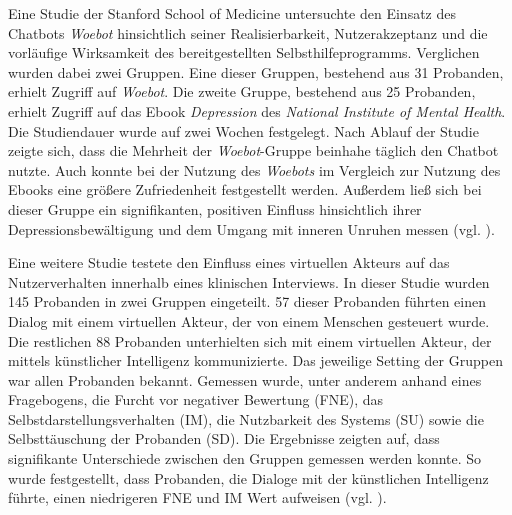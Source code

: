 Eine Studie der Stanford School of Medicine untersuchte den Einsatz des Chatbots \emph{Woebot} hinsichtlich seiner Realisierbarkeit, Nutzerakzeptanz und die vorläufige Wirksamkeit des bereitgestellten Selbsthilfeprogramms. Verglichen wurden dabei zwei Gruppen. Eine dieser Gruppen, bestehend aus 31 Probanden, erhielt Zugriff auf \emph{Woebot}. Die zweite Gruppe, bestehend aus 25 Probanden, erhielt Zugriff auf das Ebook \emph{Depression} des \emph{National Institute of Mental Health}. Die Studiendauer wurde auf zwei Wochen festgelegt. Nach Ablauf der Studie zeigte sich, dass die Mehrheit der \emph{Woebot}-Gruppe beinhahe täglich den Chatbot nutzte. Auch konnte bei der Nutzung des \emph{Woebots} im Vergleich zur Nutzung des Ebooks eine größere Zufriedenheit festgestellt werden. Außerdem ließ sich bei dieser Gruppe ein signifikanten, positiven Einfluss hinsichtlich ihrer Depressionsbewältigung und dem Umgang mit inneren Unruhen messen (vgl. \cite{Fitzpatrick2017}).

Eine weitere Studie testete den Einfluss eines virtuellen Akteurs auf das Nutzerverhalten innerhalb eines klinischen Interviews. In dieser Studie wurden 145 Probanden in zwei Gruppen eingeteilt. 57 dieser Probanden führten einen Dialog mit einem virtuellen Akteur, der von einem Menschen gesteuert wurde. Die restlichen 88 Probanden unterhielten sich mit einem virtuellen Akteur, der mittels künstlicher Intelligenz kommunizierte. Das jeweilige Setting der Gruppen war allen Probanden bekannt. Gemessen wurde, unter anderem anhand eines Fragebogens, die Furcht vor negativer Bewertung (FNE), das Selbstdarstellungsverhalten (IM), die Nutzbarkeit des Systems (SU) sowie die Selbsttäuschung der Probanden (SD). Die Ergebnisse zeigten auf, dass signifikante Unterschiede zwischen den Gruppen gemessen werden konnte. So wurde festgestellt, dass Probanden, die Dialoge mit der künstlichen Intelligenz führte, einen niedrigeren FNE und IM Wert aufweisen (vgl. \cite{Gratch2014}). 


